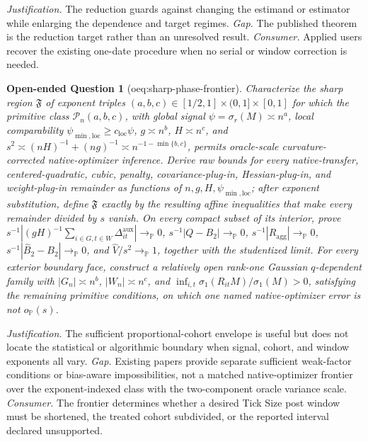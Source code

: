 \documentclass{article}
\newtheorem{openendedquestion}{Open-ended Question}
\begin{document}
\par\smallskip\noindent \textit{Justification.} The reduction guards against changing the estimand or estimator while enlarging the dependence and target regimes. \textit{Gap.} The published theorem is the reduction target rather than an unresolved result. \textit{Consumer.} Applied users recover the existing one-date procedure when no serial or window correction is needed.

\begin{openendedquestion}[oeq:sharp-phase-frontier]\label{oeq:sharp-phase-frontier}
Characterize the sharp region \(\mathfrak F\) of exponent triples \((a,b,c)\in[1/2,1]\times(0,1]\times[0,1]\) for which the primitive class \(\mathcal P_n(a,b,c)\), with global signal \(\psi=\sigma_r(M)\asymp n^a\), local comparability \(\psi_{\min,\mathrm{loc}}\ge c_{\mathrm{loc}}\psi\), \(g\asymp n^b\), \(H\asymp n^c\), and \(s^2\asymp(nH)^{-1}+(ng)^{-1}\asymp n^{-1-\min\{b,c\}}\), permits oracle-scale curvature-corrected native-optimizer inference. Derive raw bounds for every native-transfer, centered-quadratic, cubic, penalty, covariance-plug-in, Hessian-plug-in, and weight-plug-in remainder as functions of \(n,g,H,\psi_{\min,\mathrm{loc}}\); after exponent substitution, define \(\mathfrak F\) exactly by the resulting affine inequalities that make every remainder divided by \(s\) vanish. On every compact subset of its interior, prove \(s^{-1}|(gH)^{-1}\sum_{i\in G,t\in W}\Delta^{\mathrm{aux}}_{it}|\to_{\mathbb P}0\), \(s^{-1}|Q-B_2|\to_{\mathbb P}0\), \(s^{-1}|R_{\mathrm{agg}}|\to_{\mathbb P}0\), \(s^{-1}|\widehat B_2-B_2|\to_{\mathbb P}0\), and \(\widehat V/s^2\to_{\mathbb P}1\), together with the studentized limit. For every exterior boundary face, construct a relatively open rank-one Gaussian \(q\)-dependent family with \(|G_n|\asymp n^b\), \(|W_n|\asymp n^c\), and \(\inf_{i,t}\sigma_1(R_{it}M)/\sigma_1(M)>0\), satisfying the remaining primitive conditions, on which one named native-optimizer error is not \(o_{\mathbb P}(s)\).
\end{openendedquestion}
\par\smallskip\noindent \textit{Justification.} The sufficient proportional-cohort envelope is useful but does not locate the statistical or algorithmic boundary when signal, cohort, and window exponents all vary. \textit{Gap.} Existing papers provide separate sufficient weak-factor conditions or bias-aware impossibilities, not a matched native-optimizer frontier over the exponent-indexed class with the two-component oracle variance scale. \textit{Consumer.} The frontier determines whether a desired Tick Size post window must be shortened, the treated cohort subdivided, or the reported interval declared unsupported.
\end{document}
